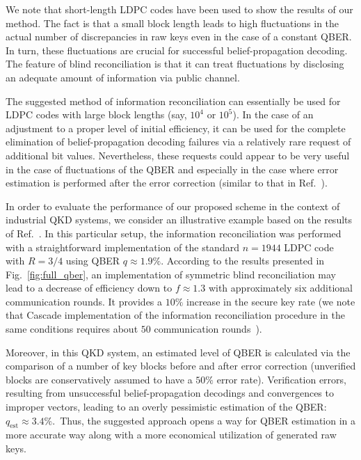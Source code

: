 \documentclass[aps,pra,twocolumn,amsmath,amssymb,nofootinbib,showpacs,superscriptaddress]{revtex4-1}
\begin{document}
We note that short-length LDPC codes have been used to show the results of our method. 
The fact is that a small block length leads to high fluctuations in the actual number of discrepancies in raw keys even in the case of a constant QBER.
In turn, these fluctuations are crucial for successful belief-propagation decoding.
The feature of blind reconciliation is that it can treat fluctuations by disclosing an adequate amount of information via public channel.

The suggested method of information reconciliation can essentially be used for LDPC codes with large block lengths (say, $10^4$ or $10^5$).
In the case of an adjustment to a proper level of initial efficiency, it can be used for the complete elimination of belief-propagation decoding failures via a relatively rare request of additional bit values.
Nevertheless, these requests could appear to be very useful in the case of fluctuations of the QBER and especially in the case where error estimation is performed after the error correction (similar to that in Ref.~\cite{Gisin2}).

In order to evaluate the performance of our proposed scheme in the context of industrial QKD systems, we consider an illustrative example based on the results of Ref.~\cite{Gisin2}.
In this particular setup, the information reconciliation was performed with a straightforward implementation of the standard $n=1944$ LDPC code~\cite{Standard} 
with $R=3/4$ using QBER $q\approx 1.9\%$.
According to the results presented in Fig.~\ref{fig:full_qber}, 
an implementation of symmetric blind reconciliation may lead to a decrease of efficiency down to $f\approx 1.3$ with approximately six additional communication rounds.
It provides a $10\%$ increase in the secure key rate 
(we note that Cascade implementation of the information reconciliation procedure in the same conditions requires about $50$ communication rounds~\cite{Cascade2_rev}).

Moreover, in this QKD system, an estimated level of QBER is calculated via the comparison of a number of key blocks before and after error correction 
(unverified blocks are conservatively assumed to have a $50\%$ error rate).
Verification errors, resulting from unsuccessful belief-propagation decodings and convergences to improper vectors, 
leading to an overly pessimistic estimation of the QBER: 
$q_\mathrm{est}\approx3.4\%$.~Thus, the suggested approach opens a way for QBER estimation in a more accurate way along with a more economical utilization of generated raw keys.
\end{document}
